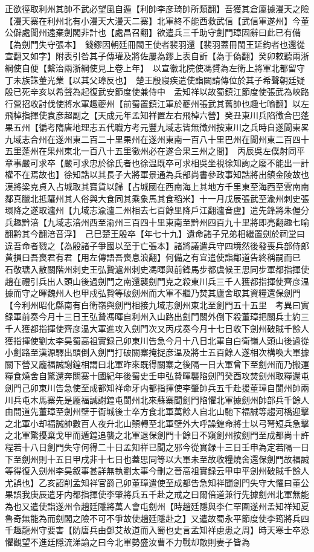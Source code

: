 正欲徑取利州其帥不武必望風自遁【利帥李彦琦帥所類翻】吾獲其倉廩據漫天之險【漫天寨在利州北有小漫天大漫天二寨】北軍終不能西救武信【武信軍遂州】今董公僻處閬州遠棄劍閣非計也【處昌召翻】欲遣兵三千助守劍門璋固辭曰此已有備【為劍門失守張本】　錢鏐因朝廷冊閩王使者裴羽還【裴羽蓋冊閩王延鈞者也還從宣翻又如字】附表引咎其子傳瓘及將佐屢為鏐上表自訢【為于偽翻】癸卯敕聽兩浙綱使自便【繫治兩浙綱使見上卷上年】　以宣徽北院使馮贇為左衛上將軍北都留守　丁未族誅董光業【以其父璋反也】　楚王殷寢疾遣使詣闕請傳位於其子希聲朝廷疑殷已死辛亥以希聲為起復武安節度使兼侍中　孟知祥以故蜀鎮江節度使張武為峽路行營招收討伐使將水軍趣夔州【前蜀置鎮江軍於夔州張武其舊帥也趣七喻翻】以左飛棹指揮使袁彦超副之【天成元年孟知祥置左右飛棹六營】癸丑東川兵陷徵合巴蓬果五州【徧考隋唐地理志五代職方考元豐九域志皆無徵州按東川之兵時自遂閬東畧九域志合州在遂州東二百二十里果州在遂州東南一百八十里巴州在閬州東二百四十五里蓬州在果州東北一百八十五里徵州必在遂合果三州之間】　丙辰吳左僕射同平章事嚴可求卒【嚴可求忠於徐氏者也徐温既卒可求相吳坐視徐知詢之廢不能出一計權不在焉故也】徐知誥以其長子大將軍景通為兵部尚書參政事知誥將出鎮金陵故也　漢將梁克貞入占城取其寶貨以歸【占城國在西南海上其地方千里東至海西至雲南南鄰真臘北抵驩州其人俗與大食同其乘象馬其食稻米】十一月戊辰張武至渝州刺史張環降之遂取瀘州【九域志渝瀘二州相去七百餘里降戶江翻瀘音盧】遣先鋒將朱偓分兵趣黔涪【九域志涪州西至渝州三百四十里東南至黔州四百九十里將即亮翻趣七喻翻黔其今翻涪音浮】　己巳楚王殷卒【年七十九】遺命諸子兄弟相繼置劍於祠堂曰違吾命者戮之【為殷諸子爭國以至于亡張本】諸將議遣兵守四境然後發喪兵部侍郎黄損曰吾喪君有君【用左傳語吾喪息浪翻】何備之有宜遣使詣鄰道告終稱嗣而已　石敬瑭入散關階州刺史王弘贄瀘州刺史馮暉與前鋒馬步都虞候王思同步軍都指揮使趙在禮引兵出人頭山後過劍門之南還襲劍門克之殺東川兵三千人獲都指揮使齊彦温據而守之暉魏州人也甲戍弘贄等破劍州而大軍不繼乃焚其廬舍取其資糧還保劍門【今利州昭化縣南有白衛嶺與劍門相接九域志劍州東北至劍門五十五里　考異曰實録軍前奏今月十三日王弘贄馮暉自利州入山路出劍門關外倒下殺董璋把關兵士約三千人獲都指揮使齊彦温大軍進攻入劍門次又丙戌奏今月十七日收下劍州破賊千餘人獲指揮使劉太李昊蜀高祖實録己卯東川告急今月十八日北軍自白衛嶺人頭山後過從小劍路至漢源驛出頭倒入劍門打破關寨掩捉彦温及將士五百餘人遂相次構喚大軍據關下營又龐福誠謝鍠相謂曰北軍昨來既得關寨之後隔一日大軍曾下至劍州而乃搬運糧食燒舍自驚還奔關寨十國紀年後蜀史壬申弘贄暉襲陷劍門癸酉攻焚劍州取糧還屯劍門己卯東川告急使至成都知祥命牙内都指揮使李肇帥兵五千赴援董璋自閬州帥兩川兵屯木馬寨先是龎福誠謝鍠屯閬州北來蘇寨聞劍門陷懼北軍據劍州帥部兵千餘人由間道先董璋至劍州壁于衙城後士卒方食北軍萬餘人自北山馳下福誠等趨河橋迎擊之北軍小却福誠帥數百人夜升北山顛轉至北軍壁外大呼譟鍠命將士以弓弩短兵急擊之北軍驚擾棄戈甲而遁鍠追襲之北軍退保劍門十餘日不窺劍州按劍門至成都尚十許程若十八日劍門失守何得二十日孟知祥已聞之邪今從實録十三日壬申為定若隔一日下至劍州則十五日甲戌非十七日也蓋思同等以大軍未至故收糧燒舍還保劍門故福誠等得復入劍州李昊叙事甚詳無執劉太事今刪之晉高祖實録云甲申平劍州破賊千餘人尤誤也】乙亥詔削孟知祥官爵己卯董璋遣使至成都告急知祥聞劍門失守大懼曰董公果誤我庚辰遣牙内都指揮使李肇將兵五千赴之戒之曰爾倍道兼行先據劍州北軍無能為也又遣使詣遂州令趙廷隱將萬人會屯劍州【時趙廷隱與李仁罕圍遂州孟知祥知夏魯奇無能為而劍閣之險不可不爭故使趙廷隱赴之】又遣故蜀永平節度使李筠將兵四千趣龍州守要害【防唐兵由鄧艾故道而入蜀也史言孟知祥慮患之周】時天寒士卒恐懼觀望不進廷隱流涕諭之曰今北軍勢盛汝曹不力戰却敵則妻子皆為